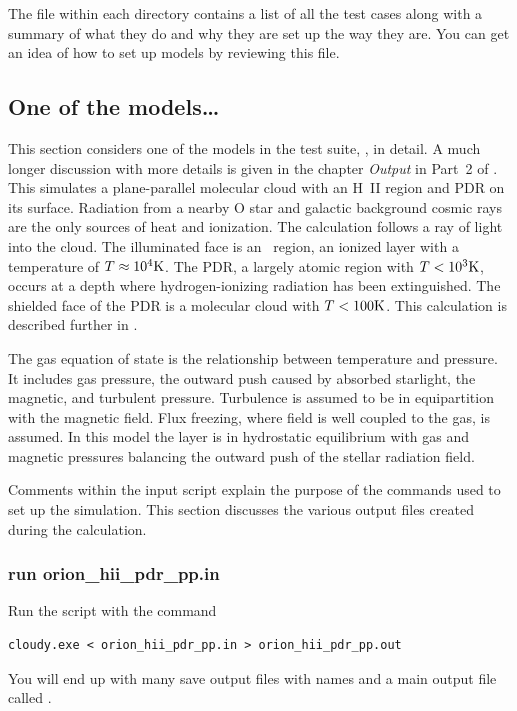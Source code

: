 \documentclass[12pt,twoside]{article}
\begin{document}
The file  within
each directory contains a list of all
the test cases along with a summary of what they do and why they are set
up the way they are.  You can get an idea of how to set up models by
reviewing this file.

\subsection{One of the models\ldots}

This section considers one of the models in the test suite,
, in detail.  A
much longer discussion with more details
is given in the chapter \emph{Output} in Part~2 of \Hazy.
This simulates a
plane-parallel molecular cloud with an H~II region and PDR on its surface.
Radiation from a nearby O star and galactic background cosmic rays are the
only sources of heat and ionization.  The calculation follows a ray of light
into the cloud.  The illuminated face is an \hplus\ region, an ionized layer
with a temperature of $T \approx 10^4\rm{K}$.
The PDR, a largely atomic region with
$T < 10^3\rm{K}$, occurs at a depth where
hydrogen-ionizing radiation has been
extinguished.  The shielded face of the PDR is a molecular
cloud with $T < 100\rm{K}$.
This calculation is described further in \citet{Ferland03}.

The gas equation of state is the relationship between temperature and
pressure.  It includes gas pressure, the outward push caused by absorbed
starlight, the magnetic, and turbulent pressure.   Turbulence is assumed
to be in equipartition with the magnetic field.
Flux freezing, where field is well coupled to the gas, is assumed.
In this model the layer is in hydrostatic equilibrium with gas and magnetic
pressures balancing the outward push of the stellar radiation field.

Comments within the input script explain the purpose of the commands
used to set up the simulation.
This section discusses the various output
files created during the calculation.

\subsubsection{run orion\_hii\_pdr\_pp.in}

Run the  script with the command
\small
\begin{verbatim}
cloudy.exe < orion_hii_pdr_pp.in > orion_hii_pdr_pp.out
\end{verbatim}
\normalsize
You will end up with many save output files with names
and a main output file called .
\end{document}

